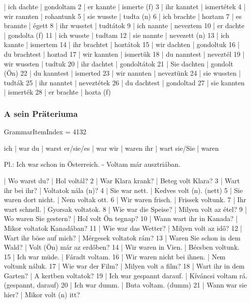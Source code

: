 \documentclass{article}
\newenvironment{desc}{\verbatim}{\endverbatim}
\newenvironment{exmp}{\verbatim}{\endverbatim}
\begin{document}
\begin{exmp}
1 | ich dachte | gondoltam
2 | er kannte | ismerte (f)
3 | ihr kanntet | ismertétek
4 | wir rannten | rohantunk
5 | sie wusste | tudta (n)
6 | ich brachte | hoztam
7 | es brannte | égett
8 | ihr wusstet | tudtátok
9 | ich nannte | neveztem
10 | er dachte | gondolta (f)
11 | ich wusste | tudtam
12 | sie nannte | nevezett (n)
13 | ich kannte | ismertem
14 | ihr brachtet | hoztátok
15 | wir dachten | gondoltuk
16 | du brachtest | hoztad
17 | wir kannten | ismertük
18 | du nanntest | neveztél
19 | wir wussten | tudtuk
20 | ihr dachtet | gondoltátok
21 | Sie dachten | gondolt (Ön)
22 | du kanntest | ismerted
23 | wir nannten | neveztünk
24 | sie wussten | tudták
25 | ihr nanntet | neveztétek
26 | du dachtest | gondoltad
27 | sie kannten | ismerték
28 | er brachte | hozta (f)
\end{exmp}

\subsubsection{A sein Präteriuma}

GrammarItemIndex = 4132

\begin{desc}
ich       | war
du        | warst
er/sie/es | war
wir       | waren
ihr       | wart
sie/Sie   | waren

Pl.: Ich war schon in Österreich. - Voltam már ausztriában.
\end{desc}

\begin{exmp}
1 | Wo warst du? | Hol voltál?
2 | War Klara krank? | Beteg volt Klara?
3 | Wart ihr bei ihr? | Voltatok nála (n)?
4 | Sie war nett. | Kedves volt (n). (nett)
5 | Sie waren dort nicht. | Nem voltak ott.
6 | Wir waren frisch. | Frissek voltunk.
7 | Ihr wart schnell. | Gyorsak voltatok.
8 | Wie war die Speise? | Milyen volt az étel?
9 | Wo waren Sie gestern? | Hol volt Ön tegnap?
10 | Wann wart ihr in Kanada? | Mikor voltatok Kanadában?
11 | Wie war das Wetter? | Milyen volt az idő?
12 | Wart ihr böse auf mich? | Mérgesek voltatok rám?
13 | Waren Sie schon in dem Wald? | Volt (Ön) már az erdőben?
14 | Wir waren in Vien. | Bécsben voltunk.
15 | Ich war müde. | Fáradt voltam.
16 | Wir waren nicht bei ihnen. | Nem voltunk náluk.
17 | Wie war der Film? | Milyen volt a film?
18 | Wart ihr in dem Garten? | A kertben voltatok?
19 | Ich war gespannt darauf. | Kíváncsi voltam rá. (gespannt, darauf)
20 | Ich war dumm. | Buta voltam. (dumm)
21 | Wann war sie hier? | Mikor volt (n) itt?
\end{exmp}
\end{document}
